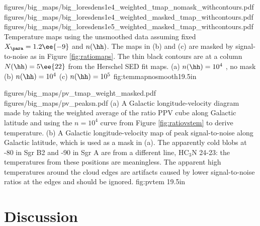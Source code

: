 \RotFigureThreeAA
{figures/big_maps/big_loresdens1e4_weighted_tmap_nomask_withcontours.pdf}
{figures/big_maps/big_loresdens1e4_weighted_masked_tmap_withcontours.pdf}
{figures/big_maps/big_loresdens1e5_weighted_masked_tmap_withcontours.pdf}
{Temperature maps using the unsmoothed data assuming fixed $X_{\para}=1.2\ee{-9}$
and $n(\hh)$.  The maps in (b) and (c) are masked by signal-to-noise as in
Figure \ref{fig:ratiomaps}.  The thin black contours are at a column
$N(\hh)=5\ee{22}$ \percc
from the Herschel SED fit maps.
(a) $n(\hh) = 10^4$ \percc, no mask
(b) $n(\hh) = 10^4$ \percc
(c) $n(\hh) = 10^5$ \percc
}
{fig:temmapnosmooth}{1}{9.5in}





\RotFigureTwoAA
{figures/big_maps/pv_tmap_weight_masked.pdf}
{figures/big_maps/pv_peaksn.pdf}
{(a) A Galactic longitude-velocity diagram made by taking the weighted average
of the ratio PPV cube along Galactic latitude and using the $n=10^4$ \percc curve
from Figure \ref{fig:ratiovstem} to derive temperature.  (b) A Galactic
longitude-velocity map of peak
signal-to-noise along Galactic latitude, which is used as a mask in (a).  The
apparently cold blobs at -80 \kms in Sgr
B2 and -90 \kms in Sgr A are from a different line, HC$_3$N 24-23: the
temperatures from these positions are meaningless.
The apparent high temperatures around the cloud edges are artifacts caused by
lower signal-to-noise ratios at the edges and should be ignored.
}
{fig:pvtem}
{1}{9.5in}



\clearpage
\section{Discussion}
\label{sec:discussion}
